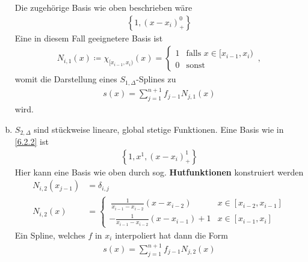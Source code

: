 \begin{Bspe}
\begin{enumerate}[a)]
    Die zugehörige Basis wie oben beschrieben wäre
    \begin{gather*}
      \left\{ 1,(x-x_i)_+^0\right\}
    \end{gather*}
    Eine in diesem Fall geeignetere Basis ist
    \begin{gather*}
      N_{i,1} (x)\coloneqq \chi_{[x_{i-1},x_i)}(x)
      = \begin{cases}
        1 & \text{falls } x\in[x_{i-1},x_i)\\
        0 & \text{sonst}
      \end{cases}\, ,
    \end{gather*}
    womit die Darstellung eines $S_{1,\Delta}$-Splines zu 
    \begin{gather*}
      s(x) = \sum_{j=1}^{n+1} f_{j-1} N_{j,1}(x)
    \end{gather*}
    wird.
  \item {} $S_{2,\Delta}$ sind stückweise lineare, global stetige
    Funktionen. Eine Basis wie in \ref{6.2.2} ist
    \begin{gather*}
      \left\{1,x^1, (x-x_i)_+^1\right\}
    \end{gather*}
    \label{im6.2.4(2)}
    Hier kann eine Basis wie oben durch sog. 
    \textbf{Hutfunktionen}
    konstruiert werden
    \begin{align*}
      N_{i,2}(x_{j-1}) &= \delta_{i,j}\\
      N_{i,2}(x) &= \begin{cases}
        ~\frac{1}{x_{i-1}-x_{i-2}}(x-x_{i-2}) & x\in [x_{i-2}, x_{i-1}]\\
        -\frac{1}{x_{i-1}-x_{i-2}}(x-x_{i-1})+1 & x\in [x_{i-1}, x_i]
      \end{cases}
    \end{align*}
    \label{im6.2.4(3)}
    Ein Spline, welches $f$ in $x_i$ interpoliert hat dann die Form
    \begin{gather*}
      s(x) = \sum_{j=1}^{n+1}f_{j-1}N_{j,2}(x)
    \end{gather*}
  \end{enumerate}
\end{Bspe}


